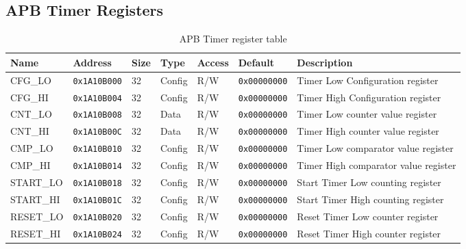 \subsection{APB Timer Registers}
\begin{table}[htbp]
  \small
\begin{tabularx}{\textwidth}{|l|l|l|l|l|l|X|}
  \hline
  \textbf{Name} & \textbf{Address}  & \textbf{Size} & \textbf{Type} & \textbf{Access} & \textbf{Default} & \textbf{Description} \\
  \hline
  CFG\_LO   & \texttt{0x1A10B000} & 32 & Config & R/W & \texttt{0x00000000} & Timer Low Configuration register \\
  \hline
  CFG\_HI   & \texttt{0x1A10B004}  & 32 & Config & R/W & \texttt{0x00000000} & Timer High Configuration register\\
  \hline
  CNT\_LO   & \texttt{0x1A10B008}  & 32 & Data & R/W &   \texttt{0x00000000}  & Timer Low counter value register\\
  \hline
  CNT\_HI   & \texttt{0x1A10B00C}  & 32 & Data & R/W &   \texttt{0x00000000} & Timer High counter value register\\
  \hline
  CMP\_LO   & \texttt{0x1A10B010}  & 32 & Config & R/W & \texttt{0x00000000}  & Timer Low comparator value register\\
  \hline
  CMP\_HI   & \texttt{0x1A10B014}  & 32 & Config & R/W & \texttt{0x00000000} & Timer High comparator value register\\
  \hline
  START\_LO & \texttt{0x1A10B018}  & 32 & Config & R/W & \texttt{0x00000000} & Start Timer Low counting register\\
  \hline
  START\_HI & \texttt{0x1A10B01C}  & 32 & Config & R/W & \texttt{0x00000000} & Start Timer High counting register\\
  \hline
  RESET\_LO & \texttt{0x1A10B020}  & 32 & Config & R/W & \texttt{0x00000000} & Reset Timer Low counter register\\
  \hline
  RESET\_HI & \texttt{0x1A10B024}  & 32 & Config & R/W & \texttt{0x00000000} & Reset Timer High counter register\\
  \hline

\end{tabularx}
\caption{APB Timer register table\label{tab:apb_timer}}
\end{table}

